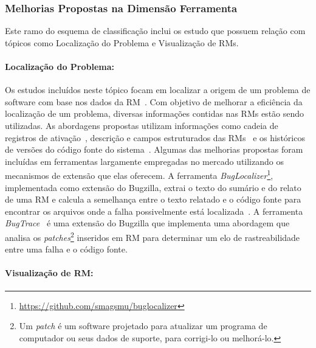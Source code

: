 

\subsubsection{Melhorias Propostas na Dimensão Ferramenta}
\label{ssub:melhorias_dim_ferramenta}

Este ramo do esquema de classificação inclui os estudo que possuem relação com
tópicos como Localização do Problema e Visualização de RMs.

\paragraph{Localização do Problema:}

Os estudos incluídos neste tópico focam em localizar a origem de um problema de
software com base nos dados da RM~\cite{Hovemeyer:2004:FBE:1052883.1052895}.
Com objetivo de melhorar a eficiência da localização de um problema, diversas
informações contidas nas RMs estão sendo utilizadas. As abordagens propostas
utilizam informações como cadeia de registros de
ativação~\cite{Wong:2014:BBF:2705615.2706096}, des\-cri\-ção e campos
estruturados das RMs~\cite{Thung:2014:BIT:2635868.2661678} e os históricos de
versões do código fonte do
sistema~\cite{Bangcharoensap:2012:LSC:2419061.2419428, corley2011recovering,
    Romo:2015:TAT:2745802.2745833}. Algumas das melhorias propostas foram
incluídas em ferramentas largamente empregadas no mercado utilizando os
mecanismos de extensão que elas oferecem. A ferramenta
\textit{BugLocalizer}\footnote{\url{https://github.com/smagsmu/buglocalizer}},
implementada como extensão do Bugzilla, extrai o texto do sumário e do relato
de uma RM e calcula a semelhança entre o texto relatado e o código fonte para
encontrar os arquivos onde a falha possivelmente está
localizada~\cite{Thung:2014:BIT:2635868.2661678}. A ferramenta
\textit{BugTrace}~\cite{corley2011recovering} é uma extensão do Bugzilla que
implementa uma abordagem que analisa os \textit{patches}\footnote{Um
    \textit{patch} é um software projetado para atualizar um programa de
    computador ou seus dados de suporte, para corrigi-lo ou melhorá-lo.}
inseridos em RM para determinar um elo de rastreabilidade entre uma falha e o
código fonte.

\paragraph{Visualização de RM:}

